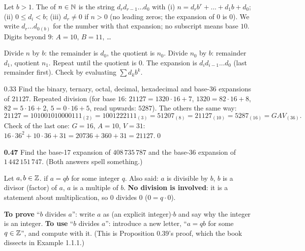 
\begin{key}
Let $b>1$. The  of $n\in\mathbb{N}$ is the string $d_rd_{r-1}\dots d_0$ with (i) $n=d_rb^r+\dots+d_1b+d_0$; (ii) $0\le d_i<b$; (iii) $d_r\ne0$ if $n>0$ (no leading zeros; the expansion of $0$ is $0$). We write $d_r\dots d_0{}_{(b)}$ for the number with that expansion; no subscript means base $10$. Digits beyond $9$: $A=10$, $B=11$, \dots
\end{key}

\begin{strategy}
Divide $n$ by $b$: the remainder is $d_0$, the quotient is $n_0$. Divide $n_0$ by $b$: remainder $d_1$, quotient $n_1$. Repeat until the quotient is $0$. The expansion is $d_id_{i-1}\dots d_0$ (last remainder first). Check by evaluating $\sum d_kb^k$.
\end{strategy}

\begin{bookex}{0.33}
Find the binary, ternary, octal, decimal, hexadecimal and base-36 expansions of $21127$.
\solution
Repeated division (for base $16$: $21127=1320\cdot16+7$, $1320=82\cdot16+8$, $82=5\cdot16+2$, $5=0\cdot16+5$, read upwards: $5287$). The others the same way:
\[
21127=101001010000111_{(2)}=1001222111_{(3)}=51207_{(8)}=21127_{(10)}=5287_{(16)}=GAV_{(36)} .
\]
Check of the last one: $G=16$, $A=10$, $V=31$: $16\cdot36^2+10\cdot36+31=20736+360+31=21127$.\qed
\end{bookex}

\begin{trybox}[{0.47 \fO}]
\textbf{0.47} Find the base-17 expansion of $408\,735\,787$ and the base-36 expansion of $1\,442\,151\,747$. (Both answers spell something.)
\end{trybox}


\begin{key}
Let $a,b\in\mathbb{Z}$.  if $a=qb$ for some integer $q$. Also said: $a$ is divisible by $b$, $b$ is a divisor (factor) of $a$, $a$ is a multiple of $b$. \textbf{No division is involved}: it is a statement about multiplication, so $0$ divides $0$ ($0=q\cdot0$).
\end{key}

\begin{strategy}
\textbf{To prove} ``$b$ divides $a$'': write $a$ as (an explicit integer)$\cdot b$ and say why the integer is an integer. \textbf{To use} ``$b$ divides $a$'': introduce a new letter, ``$a=qb$ for some $q\in\mathbb{Z}$'', and compute with it. (This is Proposition 0.39's proof, which the book dissects in Example 1.1.1.)
\end{strategy}

